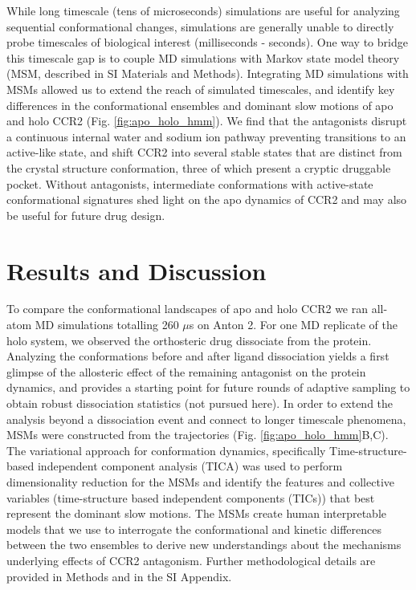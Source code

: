 While long timescale (tens of microseconds) simulations are useful for analyzing sequential conformational changes, simulations are generally unable to directly probe timescales of biological interest (milliseconds - seconds)\cite{Bowman2011}.
One way to bridge this timescale gap is to couple MD simulations with Markov state model theory\cite{Swope2004, Singhal2004, Malmstrom2014, Amaro2018, Amaro2018a, Bowman2014, Noe2007, Prinz2011a, Schutte1999} (MSM, described in SI Materials and Methods).
Integrating  MD simulations with MSMs allowed us to extend the reach of simulated timescales, and identify key differences in the conformational ensembles and dominant slow motions of apo and holo CCR2 (Fig. \ref{fig:apo_holo_hmm}).
We find that the antagonists disrupt a continuous internal water and sodium ion pathway preventing transitions to an active-like state, and shift CCR2 into several stable states that are distinct from the crystal structure conformation, three of which present a cryptic druggable pocket.
Without antagonists, intermediate conformations with active-state conformational signatures shed light on the apo dynamics of CCR2 and may also be useful for future drug design.

\section{Results and Discussion}

To compare the conformational landscapes of apo and holo CCR2 we ran all-atom MD simulations totalling 260 $\mu$s on Anton 2\cite{Shaw2014}.
For one MD replicate of the holo system, we observed the orthosteric drug dissociate from the protein.
Analyzing the conformations before and after ligand dissociation yields a first glimpse of the allosteric effect of the remaining antagonist on the protein dynamics, and provides a starting point for future rounds of adaptive sampling to obtain robust dissociation statistics (not pursued here).
In order to extend the analysis beyond a dissociation event and connect to longer timescale phenomena, MSMs were constructed from the trajectories (Fig. \ref{fig:apo_holo_hmm}B,C).
The variational approach for conformation dynamics\cite{Noe2013}, specifically Time-structure-based independent component analysis (TICA)\cite{Schwantes2013, Perez-Hernandez2013} was used to perform dimensionality reduction for the MSMs and identify the features and collective variables (time-structure based independent components (TICs)) that best represent the dominant slow motions.
The MSMs create human interpretable models that we use to interrogate the conformational and kinetic differences between the two ensembles to derive new understandings about the mechanisms underlying effects of CCR2 antagonism.
Further methodological details are provided in Methods and in the SI Appendix.


